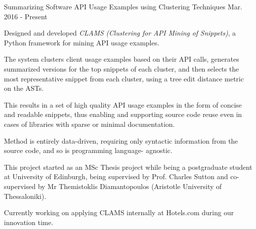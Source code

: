 

\begin{cventries}

  \cventry
    {Summarizing Software API Usage Examples using
Clustering Techniques} %
	{}
	{}
    {Mar. 2016 - Present} %
    {
      \begin{cvitems} %
        \item {Designed and developed \textit{CLAMS (Clustering for API Mining of Snippets)}, a Python framework for mining API usage examples.}
		\item {The system clusters client usage examples based on their API calls, generates summarized versions for the top snippets of each cluster, and then selects the most representative snippet from each cluster, using a tree edit distance metric on the ASTs.}
		\item {This results in a set of high quality API usage examples in the form of concise and readable snippets, thus enabling and supporting source code reuse even in cases of libraries with sparse or minimal documentation.}
		\item {Method is entirely data-driven, requiring only syntactic information from the source code, and so is programming language- agnostic.}
		\item {This project started as an MSc Thesis project while being a postgraduate student at University of Edinburgh, being supervised by Prof. Charles Sutton and co-supervised by Mr Themistoklis Diamantopoulos (Aristotle University of Thessaloniki).}
		\item {Currently working on applying CLAMS internally at Hotels.com during our innovation time.}
      \end{cvitems}
    }
    

\end{cventries}
